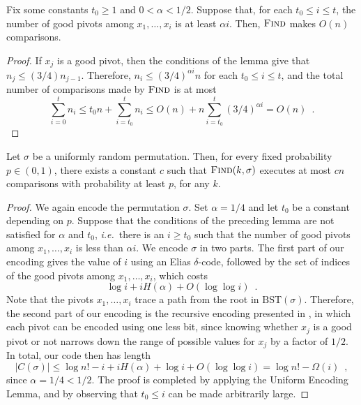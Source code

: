 \documentclass[format=acmsmall, review=false, screen=true]{acmart}
\begin{document}
\begin{lem}
  Fix some constants $t_0 \geq 1$ and $0 < \alpha < 1/2$. Suppose
  that, for each $t_0 \leq i \leq t$, the number of good pivots among
  $x_1, \ldots, x_i$ is at least $\alpha i$. Then, $\textsc{Find}$
  makes $O(n)$ comparisons.
\end{lem}
\begin{proof}
  If $x_j$ is a good pivot, then the conditions of the lemma give that
  $n_j \le (3/4) n_{j - 1}$. Therefore, $n_i \leq (3/4)^{\alpha i} n$
  for each $t_0 \leq i \leq t$, and the total number of comparisons
  made by $\textsc{Find}$ is at most
  \[
    \sum_{i=0}^t n_i \le t_0 n + \sum_{i=t_0}^t n_i \le O(n) + n
    \sum_{i = t_0}^t (3/4)^{\alpha i} = O(n) \enspace . 
  \]
\end{proof}

\begin{thm}
  Let $\sigma$ be a uniformly random permutation. Then, for 
  every fixed probability $p \in (0,1)$, there exists
  a constant $c$ such that 
  $\textsc{Find}(k, \sigma)$ executes at most $cn$ comparisons with 
  probability at least $p$, for any $k$.
\end{thm}
\begin{proof}
  We again encode the permutation $\sigma$. Set $\alpha = 1/4$ and
  let $t_0$ be a constant depending on $p$. Suppose that the
  conditions of the preceding lemma are not satisfied for $\alpha$ and 
  $t_0$,
  \emph{i.e.}~there is an $i \geq t_0$ such that the number of good pivots
  among $x_1, \dots, x_i$ is less than $\alpha i$. We encode $\sigma$
  in two parts. The first part of our encoding gives the value of $i$
  using an Elias $\delta$-code, followed by the set of indices of the
  good pivots among $x_1, \dots, x_i$, which costs
  \[
  \log i + i H(\alpha) + O(\log \log i) \enspace .
  \]
  Note that the pivots $x_1, \dots, x_i$ trace a path from the root in
  $\text{BST}(\sigma)$. Therefore, the second part of our encoding is
  the recursive encoding presented in , in which each
  pivot can be encoded using one less bit, since knowing whether $x_j$
  is a good pivot or not narrows down the range of possible values for
  $x_j$ by a factor of $1/2$. In total, our code then has length
  \[
    |C(\sigma)| \le \log n! - i + i H(\alpha) + \log i + O(\log \log
    i) = \log n! - \varOmega(i) \enspace ,
  \]
  since $\alpha = 1/4 < 1/2$. The proof is completed by applying 
  the Uniform
  Encoding Lemma, and by observing that $t_0 \leq i$ can be made
  arbitrarily large.
\end{proof}
\end{document}
